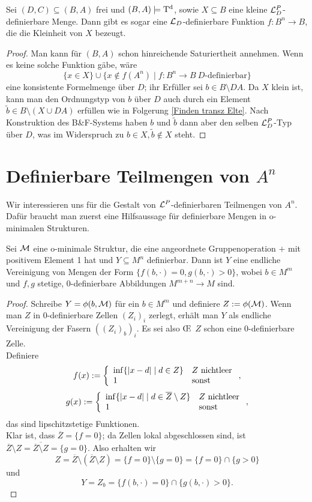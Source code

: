 \begin{lemma}\label{Speziell definierbare kleine Mengen}
	Sei $(D,C)\subseteq(B,A)$ frei und $(B,A)\models\operatorname{T^d}$, sowie $X\subseteq B$ eine kleine $\mathcal{L}^P_D$-definierbare Menge. Dann gibt es sogar eine $\mathcal{L}_D$-definierbare Funktion $f:B^n\rightarrow B$, die die Kleinheit von $X$ bezeugt.
\end{lemma}
\begin{proof}
	Man kann für $(B,A)$ schon hinreichende Saturiertheit annehmen. Wenn es keine solche Funktion gäbe, wäre $$\{x\in X\}\cup\{x\notin f(A^n)\mid f:B^n\rightarrow B\ D\text{-definierbar}\}$$ eine konsistente Formelmenge über $D$; ihr Erfüller sei $b\in B\setminus DA$. Da $X$ klein ist, kann man den Ordnungstyp von $b$ über $D$ auch durch ein Element $\tilde{b}\in B\setminus(X\cup DA)$ erfüllen wie in Folgerung \ref{Finden transz Elte}. Nach Konstruktion des B\&F-Systems haben $b$ und $\tilde{b}$ dann aber den selben $\mathcal{L}^P_D$-Typ über $D$, was im Widerspruch zu $b\in X,\tilde{b}\notin X$ steht.
\end{proof}

\section{Definierbare Teilmengen von $A^n$}
Wir interessieren uns für die Gestalt von $\mathcal{L}^P$-definierbaren Teilmengen von $A^n$. Dafür braucht man zuerst eine Hilfsaussage für definierbare Mengen in o-minimalen Strukturen.

\begin{lemma}
	Sei $\mathcal{M}$ eine o-minimale Struktur, die eine angeordnete Gruppenoperation $+$ mit positivem Element 1 hat und $Y\subseteq M^n$ definierbar. Dann ist $Y$ eine endliche Vereinigung von Mengen der Form $\{f(b,\cdot)=0,g(b,\cdot)>0\}$, wobei $b\in M^m$ und $f,g$ stetige, 0-definierbare Abbildungen $M^{m+n}\rightarrow M$ sind.
\end{lemma}
\begin{proof}
	Schreibe $Y=\phi(b,\mathcal{M})$ für ein $b\in M^m$ und definiere $Z:=\phi(\mathcal{M})$. Wenn man $Z$ in 0-definierbare Zellen $(Z_i)_i$ zerlegt, erhält man $Y$ als endliche Vereinigung der Fasern $((Z_i)_b)_i$.  Es sei also \OE\ $Z$ schon eine 0-definierbare Zelle.\\
	Definiere $$f(x):=\left\{\begin{array}{ll}
	\inf\{{\left| x-d \right|}\mid d\in Z\}&Z\text{ nichtleer}\\
	1&\text{sonst}
	\end{array}\right.,$$
	$$g(x):=\left\{\begin{array}{ll}
	\inf\{{\left| x-d \right|}\mid d\in \overline{Z}\setminus Z\}&Z\text{ nichtleer}\\
	1&\text{sonst}
	\end{array}\right.,$$ das sind lipschitzstetige Funktionen.\\
	Klar ist, dass $\overline{Z}=\{f=0\}$; da Zellen lokal abgeschlossen sind, ist $\overline{Z}\setminus Z=\overline{\overline{Z}\setminus Z}=\{g=0\}$. Also erhalten wir $$Z=\overline{Z}\setminus(\overline{Z}\setminus Z)=\{f=0\}\setminus\{g=0\}=\{f=0\}\cap\{g>0\}$$ und $$Y=Z_b=\{f(b,\cdot)=0\}\cap\{g(b,\cdot)>0\}.$$
\end{proof}

